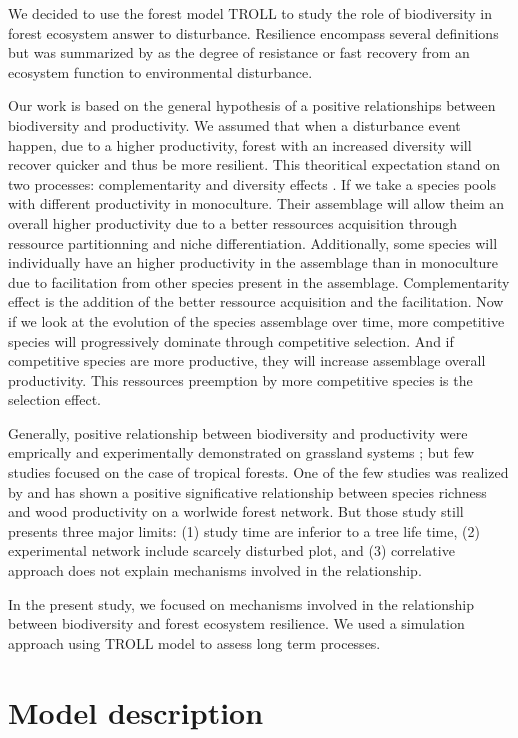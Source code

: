 \documentclass[12pt,]{article}
\let\oldsection\section
\renewcommand\section{\newpage\oldsection}
\theoremstyle{definition}
\theoremstyle{definition}
\theoremstyle{remark}
\begin{document}
We decided to use the forest model TROLL to study the role of
biodiversity in forest ecosystem answer to disturbance. Resilience
encompass several definitions but was summarized by \citet{Oliver2015}
as the degree of resistance or fast recovery from an ecosystem function
to environmental disturbance.

Our work is based on the general hypothesis of a positive relationships
between biodiversity and productivity. We assumed that when a
disturbance event happen, due to a higher productivity, forest with an
increased diversity will recover quicker and thus be more resilient.
This theoritical expectation stand on two processes: complementarity and
diversity effects \citep{Loreau2001}. If we take a species pools with
different productivity in monoculture. Their assemblage will allow theim
an overall higher productivity due to a better ressources acquisition
through ressource partitionning and niche differentiation. Additionally,
some species will individually have an higher productivity in the
assemblage than in monoculture due to facilitation from other species
present in the assemblage. Complementarity effect is the addition of the
better ressource acquisition and the facilitation. Now if we look at the
evolution of the species assemblage over time, more competitive species
will progressively dominate through competitive selection. And if
competitive species are more productive, they will increase assemblage
overall productivity. This ressources preemption by more competitive
species is the selection effect.

Generally, positive relationship between biodiversity and productivity
were emprically and experimentally demonstrated on grassland systems
\citep{Hooper2005a, Loreau2001a, Naeem2002}; but few studies focused on
the case of tropical forests. One of the few studies was realized by
\citet{Chisholm2013} and has shown a positive significative relationship
between species richness and wood productivity on a worlwide forest
network. But those study still presents three major limits: (1) study
time are inferior to a tree life time, (2) experimental network include
scarcely disturbed plot, and (3) correlative approach does not explain
mechanisms involved in the relationship.

In the present study, we focused on mechanisms involved in the
relationship between biodiversity and forest ecosystem resilience. We
used a simulation approach using TROLL model to assess long term
processes.

\section{Model description}\label{model-description}
\end{document}
